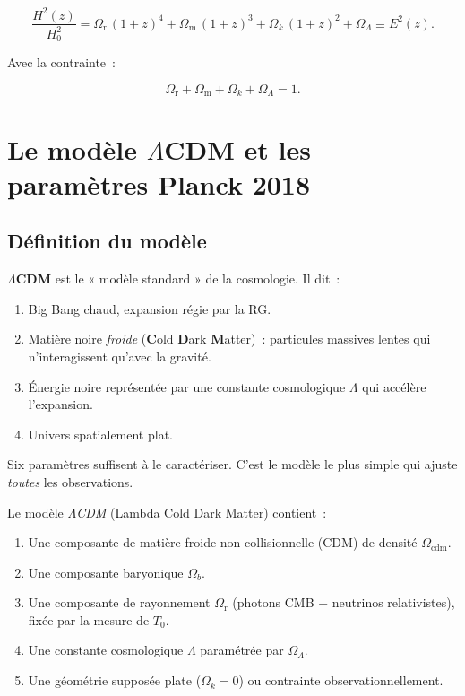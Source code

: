 \documentclass[11pt,a4paper,openany]{report}
\newcommand{\Hzero}{H_{0}}
\newcommand{\Om}{\Omega_{\mathrm{m}}}
\newcommand{\Or}{\Omega_{\mathrm{r}}}
\newcommand{\OL}{\Omega_{\Lambda}}
\newcommand{\Ok}{\Omega_{k}}
\begin{document}
\begin{equation}
\boxed{\;\frac{H^{2}(z)}{\Hzero^{2}}
       = \Or\,(1+z)^{4} + \Om\,(1+z)^{3} + \Ok\,(1+z)^{2} + \OL \equiv E^{2}(z).\;}
\label{eq:E_z}
\end{equation}

\noindent Avec la contrainte~:

\begin{equation}
\Or + \Om + \Ok + \OL = 1.
\end{equation}

\chapter{Le modèle \texorpdfstring{$\Lambda$}{Lambda}CDM et les paramètres Planck 2018}
\label{chap:lcdm}

\section{Définition du modèle}

\begin{tcolorbox}[vulgarisation]
\textbf{$\Lambda$CDM} est le « modèle standard » de la cosmologie. Il dit~:
\begin{enumerate}[topsep=2pt]
\item Big Bang chaud, expansion régie par la RG.
\item Matière noire \emph{froide} (\textbf{C}old \textbf{D}ark \textbf{M}atter)~:
  particules massives lentes qui n'interagissent qu'avec la gravité.
\item Énergie noire représentée par une constante cosmologique $\Lambda$ qui
  accélère l'expansion.
\item Univers spatialement plat.
\end{enumerate}
Six paramètres suffisent à le caractériser. C'est le modèle le plus simple
qui ajuste \emph{toutes} les observations.
\end{tcolorbox}

Le modèle \emph{$\Lambda$CDM} (Lambda Cold Dark Matter) contient~:
\begin{enumerate}[topsep=2pt]
  \item Une composante de matière froide non collisionnelle (CDM) de densité
        $\Omega_{\mathrm{cdm}}$.
  \item Une composante baryonique $\Omega_b$.
  \item Une composante de rayonnement $\Or$ (photons CMB + neutrinos
        relativistes), fixée par la mesure de $T_{0}$.
  \item Une constante cosmologique $\Lambda$ paramétrée par $\OL$.
  \item Une géométrie supposée plate ($\Ok = 0$) ou contrainte
        observationnellement.
\end{enumerate}
\end{document}
